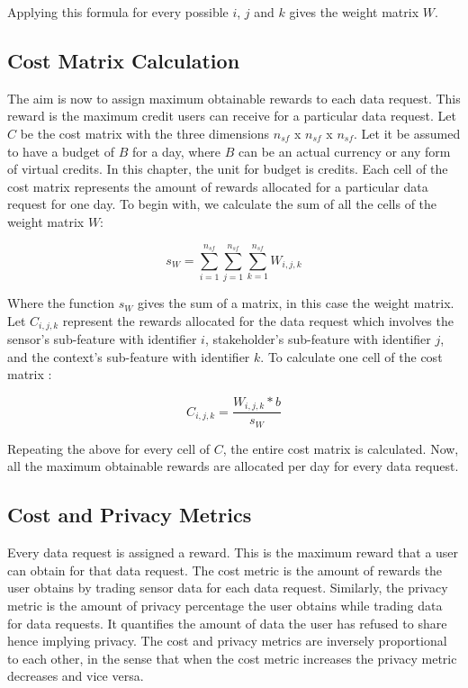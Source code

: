 Applying this formula for every possible $i$, $j$ and $k$ gives the weight matrix $W$.

\subsection{Cost Matrix Calculation}

The aim is now to assign maximum obtainable rewards to each data request. This reward is the maximum credit users can receive for a particular data request. Let $C$ be the cost matrix with the three dimensions $n_{sf}$ x $n_{sf}$ x $n_{sf}$.
Let it be assumed to have a budget of $B$ for a day, where
$B$ can be an actual currency or any form of virtual credits. In this chapter, the unit for budget is credits. Each cell of the cost matrix represents the amount of rewards allocated for a particular data request for one day.
To begin with, we calculate the sum of all the cells of the weight matrix $W$:

\begin{equation}
s_{W} = \sum\limits_{i=1}^{n_{sf}} \sum\limits_{j=1}^{n_{sf}} \sum\limits_{k=1}^{n_{sf}} W_{i,j,k}
\end{equation}

Where the function $s_{W}$ gives the sum of a matrix, in this case the weight matrix.
Let $C_{i,j,k}$ represent the rewards allocated for the data request which involves the sensor's sub-feature with identifier $i$, stakeholder's sub-feature with identifier $j$, and the context's sub-feature with identifier $k$. To calculate one cell of the cost matrix :

\begin{equation}
C_{i,j,k} = \frac{W_{i,j,k} * b}{s_{W}}
\end{equation}

Repeating the above for every cell of $C$, the entire cost matrix is calculated. Now, all the maximum obtainable rewards are allocated per day for every data request.

\subsection{Cost and Privacy Metrics} \label{o}
Every data request is assigned a reward. This is the maximum reward that a user can obtain for that data request.
The cost metric is the amount of rewards the user obtains by trading sensor data for each data request. Similarly, the privacy metric is the amount of privacy percentage the user obtains while trading data for data requests. It quantifies the amount of data the user has refused to share hence implying privacy. The cost and privacy metrics are inversely proportional to each other, in the sense that when the cost metric increases the privacy metric decreases and vice versa.

